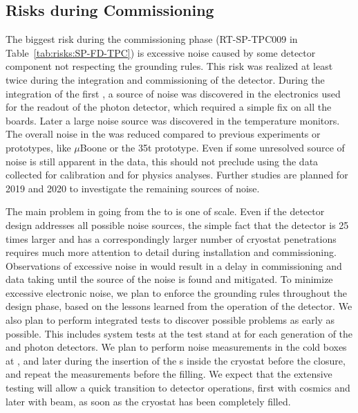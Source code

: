 \subsection{Risks during Commissioning}
\label{sec:fdsp-tpcelec-risks-commissioning}

The biggest risk during the commissioning phase
(RT-SP-TPC009 in Table~\ref{tab:risks:SP-FD-TPC}) is excessive noise 
caused by some detector component not respecting the  grounding
rules. This risk was realized at least twice during the 
integration and commissioning of the  detector. During the 
integration of the first , a source of noise was discovered 
in the electronics used for the readout of the photon  detector, which 
required a simple fix on all the boards. Later a large noise source was 
discovered in the temperature monitors. The overall noise in the  
was reduced compared to previous  experiments or prototypes, 
like $\mu$Boone or the 35t prototype. Even if some unresolved source of noise 
is still apparent in the  data, this should not preclude using the
data collected for calibration and for physics analyses. Further studies are
planned for 2019 and 2020 to investigate the remaining sources of noise.

The main problem in going from the  to  is one of scale.
Even if the detector design addresses all possible noise sources, the simple
fact that the detector is 25 times larger and has a correspondingly larger
number of cryostat penetrations requires much more attention to detail
during installation and commissioning. Observations of excessive 
noise in  would result in a delay in commissioning and  
data taking until the source of the noise is found and mitigated. To minimize excessive 
electronic noise, we plan to enforce the grounding  rules throughout the 
design phase, based on the lessons learned from the operation of the 
 detector. We also plan to perform  integrated tests to discover 
possible problems as early as possible. This includes system tests at the  test stand at  for each generation 
of the  and photon detectors. We plan to perform noise 
measurements in the cold boxes at , and later 
during the insertion of the s inside the cryostat before the 
 closure, and repeat the measurements before the  filling. 
We expect that the extensive testing will allow a quick transition to 
detector operations, first with cosmics and later with beam, as soon as the 
cryostat has been completely filled. 

